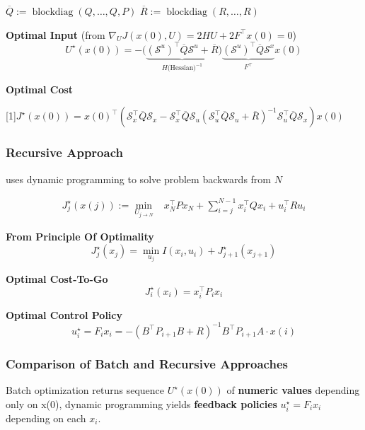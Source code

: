 $\overline{Q} := \mathop{\mathrm{blockdiag}}(Q,\dots, Q,P)$
\quad
$\overline{R} := \mathop{\mathrm{blockdiag}}(R,\dots, R)$

\textbf{Optimal Input}
(from $\nabla_UJ(x(0),U)=2HU+2F^\top x(0)=0$)
\[ U^\star(x(0)) =
	- \bigl(
	\underbrace{
			(\mathcal{S}^u)^\top \overline{Q} \mathcal{S}^u + \overline{R}
		}_{H\text{(Hessian)}^{-1}}
	\bigr)
	\underbrace{
		(\mathcal{S}^u)^\top \overline{Q}\mathcal{S}^x
	}_ {F^\top}
	x(0)
\]


\textbf{Optimal Cost}

\scalebox{0.97}[1]{$
		\scriptstyle
		J^\star(x(0)) = x(0)^\top (
		\mathcal{S}_x^\top \overline{Q} \mathcal{S}_x
		- \mathcal{S}_x^\top \overline{Q} \mathcal{S}_u
		(\mathcal{S}_u^\top \overline{Q} \mathcal{S}_u
		+ \overline{R})^{-1}
		\mathcal{S}_u^\top \overline{Q} \mathcal{S}_x
		)x(0)$}


\subsubsection{Recursive Approach}

uses dynamic programming to solve problem backwards from $N$

\[\begin{aligned}
		J_j^\star(x(j)) :=
		\min_{U_{j\to N}} & x_N^\top P x_N \!+
		\sum_{i=j}^{N-1}x_i^\top Q x_i + u_i^\top R u_i
	\end{aligned}\]


\begin{minipage}[t]{0.64\linewidth}
	\textbf{From Principle Of Optimality}
	\[
		J_j^\star(x_j) =
		\min_{u_j} I(x_i,u_i) + J_{j+1}^\star(x_{j+1})
	\]
\end{minipage}
\begin{minipage}[t]{0.32\linewidth}
	\textbf{Optimal Cost-To-Go}
	\[
		J_i^\star(x_i) = x_i^\top P_i x_i
	\]
\end{minipage}

\textbf{Optimal Control Policy}
\[
	u_i^\star = F_i x_i =
	-(B^\top P_{i+1}B + R)^{-1}
	B^\top P_{i+1} A \cdot x(i)
\]

\subsubsection{Comparison of Batch and Recursive Approaches}

Batch optimization returns sequence $U^\star(x(0))$
of \textbf{numeric values} depending only on x(0),
dynamic programming yields \textbf{feedback policies}
$u_i^\star = F_i x_i$ depending on each $x_i$.

